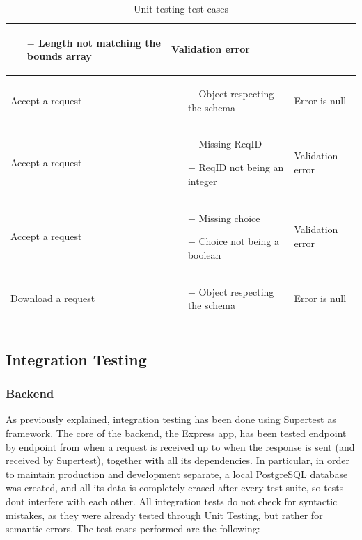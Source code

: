 \documentclass[titlepage]{article}
\begin{document}
\begin{longtable}{| p{3 cm} | p{5 cm} | p{3 cm} |}
\begin{itemize}[nolistsep]
			\item[$-$] Length not matching the bounds array
		\end{itemize}
		& Validation error \\ \hline
		Accept a request & \begin{itemize}[nolistsep]
			\item[$-$] Object respecting the schema
		\end{itemize}
		& Error is null \\ \hline
		Accept a request & \begin{itemize}[nolistsep]
			\item[$-$] Missing ReqID
			\item[$-$] ReqID not being an integer
		\end{itemize}
		& Validation error \\ \hline
		Accept a request & \begin{itemize}[nolistsep]
			\item[$-$] Missing choice
			\item[$-$] Choice not being a boolean
		\end{itemize}
		& Validation error \\ \hline
		Download a request & \begin{itemize}[nolistsep]
			\item[$-$] Object respecting the schema
		\end{itemize}
		& Error is null \\ \hline
		
		\caption{Unit testing test cases}	
	\end{longtable}
	
	\subsection{Integration Testing}
	\subsubsection{Backend}
	As previously explained, integration testing has been done using Supertest as framework. The core of the backend, the Express app, has been tested endpoint by endpoint from when a request is received up to when the response is sent (and received by Supertest), together with all its dependencies. In particular, in order to maintain production and development separate, a local PostgreSQL database was created, and all its data is completely erased after every test suite, so tests don\textsc{}t interfere with each other. 
	All integration tests do not check for syntactic mistakes, as they were already tested through Unit Testing, but rather for semantic errors.
	The test cases performed are the following:
	
\end{document}
